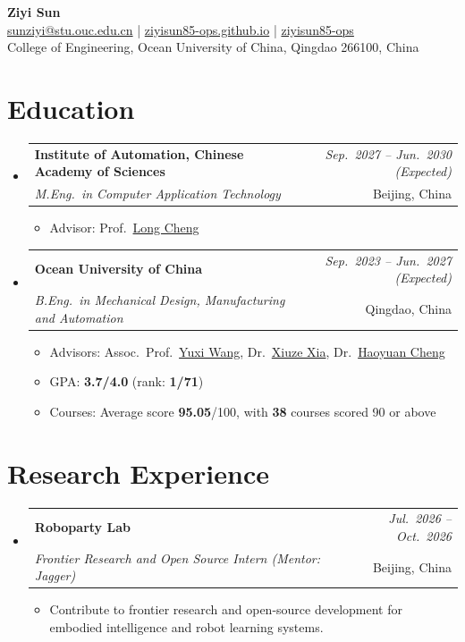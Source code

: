 \documentclass[a4paper,11pt]{article}
\makeatletter
\newcommand{\resumeSubheading}[4]{
\vspace{0.5mm}\item
    \begin{tabular*}{0.98\textwidth}[t]{l@{\extracolsep{\fill}}r}
        \textbf{#1} & \textit{\footnotesize{#4}} \\
        \textit{\footnotesize{#3}} &  \footnotesize{#2}\\
    \end{tabular*}
    \vspace{-2.4mm}
}
\newcommand{\resumeSubHeadingListStart}{\begin{itemize}[leftmargin=*,labelsep=1mm]}
\newcommand{\resumeItemListStart}{\begin{itemize}[leftmargin=*,labelsep=1mm,itemsep=0.5mm,label={$\vcenter{\hbox{\tiny$\circ$}}$}]}
\newcommand{\resumeSubHeadingListEnd}{\end{itemize}\vspace{2mm}}
\newcommand{\resumeItemListEnd}{\end{itemize}\vspace{-2mm}}
\newcommand{\socialicon}[1]{\raisebox{-0.05em}{\resizebox{!}{1em}{#1}}}
\newcommand{\headerfontiii}{\fontfamily{ppl}\selectfont}
\makeatother
\begin{document}
\headerfontiii

\begin{center}
    {\Huge\textbf{Ziyi Sun}}\\[2pt]
    \small{
    \socialicon{\faEnvelope} \href{mailto:sunziyi@stu.ouc.edu.cn}{sunziyi@stu.ouc.edu.cn} \;|\;
    \socialicon{\faGlobe} \href{https://ziyisun85-ops.github.io/}{ziyisun85-ops.github.io} \;|\;
    \socialicon{\faGithub} \href{https://github.com/ziyisun85-ops}{ziyisun85-ops}
    }\\[1pt]
    \small{College of Engineering, Ocean University of China, Qingdao 266100, China}
\end{center}
\vspace{-4mm}

\section{\textbf{Education}}
\vspace{-0.4mm}
\resumeSubHeadingListStart
\resumeSubheading
{Institute of Automation, Chinese Academy of Sciences}{Beijing, China}
{M.Eng.\ in Computer Application Technology}{Sep.\ 2027 -- Jun.\ 2030 (Expected)}
\resumeItemListStart
\item Advisor: Prof.~\href{https://ia.cas.cn/rcdw/yjy/202404/t20240425_7131817.html}{Long Cheng}
\resumeItemListEnd
\resumeSubheading
{Ocean University of China}{Qingdao, China}
{B.Eng.\ in Mechanical Design, Manufacturing and Automation}{Sep.\ 2023 -- Jun.\ 2027 (Expected)}
\resumeItemListStart
\item Advisors: Assoc.\ Prof.~\href{https://it.ouc.edu.cn/wyx/list.htm}{Yuxi Wang}, Dr.~\href{https://it.ouc.edu.cn/xxz/list.htm}{Xiuze Xia}, Dr.~\href{https://coe.ouc.edu.cn/2023/0505/c9092a431604/page.htm}{Haoyuan Cheng}
\item GPA: \textbf{3.7/4.0} (rank: \textbf{1/71})
\item Courses: Average score \textbf{95.05}/100, with \textbf{38} courses scored 90 or above
\resumeItemListEnd
\resumeSubHeadingListEnd
\vspace{-6mm}

\section{\textbf{Research Experience}}
\vspace{-0.4mm}
\resumeSubHeadingListStart
\resumeSubheading
{Roboparty Lab}{Beijing, China}
{Frontier Research and Open Source Intern (Mentor: Jagger)}{Jul.\ 2026 -- Oct.\ 2026}
\resumeItemListStart
\item Contribute to frontier research and open-source development for embodied intelligence and robot learning systems.
\resumeItemListEnd
\resumeSubHeadingListEnd
\vspace{-6mm}
\end{document}
